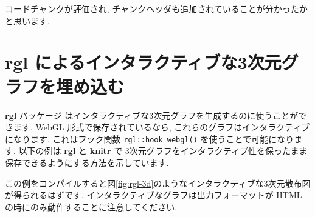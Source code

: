 \documentclass[
  11pt,
]{bxjsreport}
\newenvironment{Shaded}{\begin{snugshade}}{\end{snugshade}}
\newcommand{\AnnotationTok}[1]{\textcolor[rgb]{0.56,0.35,0.01}{\textbf{\textit{#1}}}}
\newcommand{\CommentTok}[1]{\textcolor[rgb]{0.56,0.35,0.01}{\textit{#1}}}
\newcommand{\InformationTok}[1]{\textcolor[rgb]{0.56,0.35,0.01}{\textbf{\textit{#1}}}}
\newcommand{\NormalTok}[1]{#1}
\begin{document}
コードチャンクが評価され, チャンクヘッダも追加されていることが分かったかと思います.

\hypertarget{rgl-3d}{%
\section{rgl によるインタラクティブな3次元グラフを埋め込む}\label{rgl-3d}}

\textbf{rgl} パッケージ \autocite{R-rgl} はインタラクティブな3次元グラフを生成するのに使うことができます. WebGL 形式で保存されているなら, これらのグラフはインタラクティブになります. これはフック関数 \texttt{rgl::hook\_webgl()} を使うことで可能になります. 以下の例は \textbf{rgl} と \textbf{knitr} で 3次元グラフをインタラクティブ性を保ったまま保存できるようにする方法を示しています.

\begin{Shaded}
\end{Shaded}

この例をコンパイルすると図\ref{fig:rgl-3d}のようなインタラクティブな3次元散布図が得られるはずです. インタラクティブなグラフは出力フォーマットが HTML の時にのみ動作することに注意してください.
\end{document}
